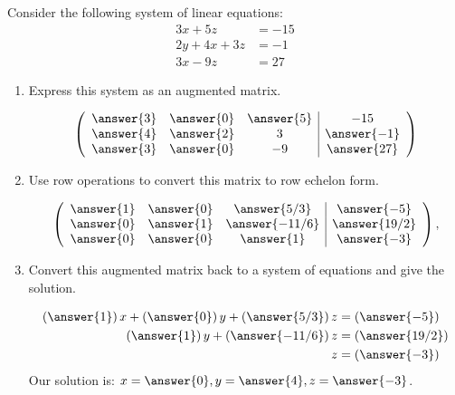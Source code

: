 \documentclass{ximera}
\author{Parisa Fatheddin}
\begin{document}
\begin{exercise}
Consider the following system of linear equations:
\begin{align*}
      3x + 5z &=  -15 \\
     2y+4x+3z&= -1\\
     3x -9z&= 27
\end{align*}
\begin{enumerate}
\item Express this system as an augmented matrix.
\begin{prompt}
\[
\left(\begin{array}{ccc|c}
  \answer{3} &  \answer{0} & \answer{5} &-15 \\
  \answer{4} & \answer{2} & 3 & \answer{-1} \\
  \answer{3} &  \answer{0} & -9 & \answer{27}
\end{array}\right)
\]
\end{prompt}
\item Use row operations to convert this matrix to row echelon form.
\begin{prompt}
\[
\left(\begin{array}{ccc|c}
  \answer{1} &  \answer{0} & \answer{5/3} &\answer{-5} \\
  \answer{0} & \answer{1} & \answer{-11/6} & \answer{19/2} \\
  \answer{0} &  \answer{0} & \answer{1} & \answer{-3}
\end{array}\right),
\]
\end{prompt}
\item Convert this augmented matrix back to a system of equations
and give the solution.
\begin{prompt}
\begin{align*}
      \left(\answer{1}\right)x + \left(\answer{0}\right)y + \left(\answer{5/3}\right)z &= \left(\answer{-5}\right) \\
     \left(\answer{1}\right)y+\left(\answer{-11/6}\right)z&=\left(\answer{19/2}\right)\\
     z&=\left(\answer{-3}\right)
\end{align*}
Our solution is: $x= \answer{0}, y= \answer{4}, z=\answer{-3}$.
\end{prompt}
\end{enumerate}
\end{exercise}
\end{document}
